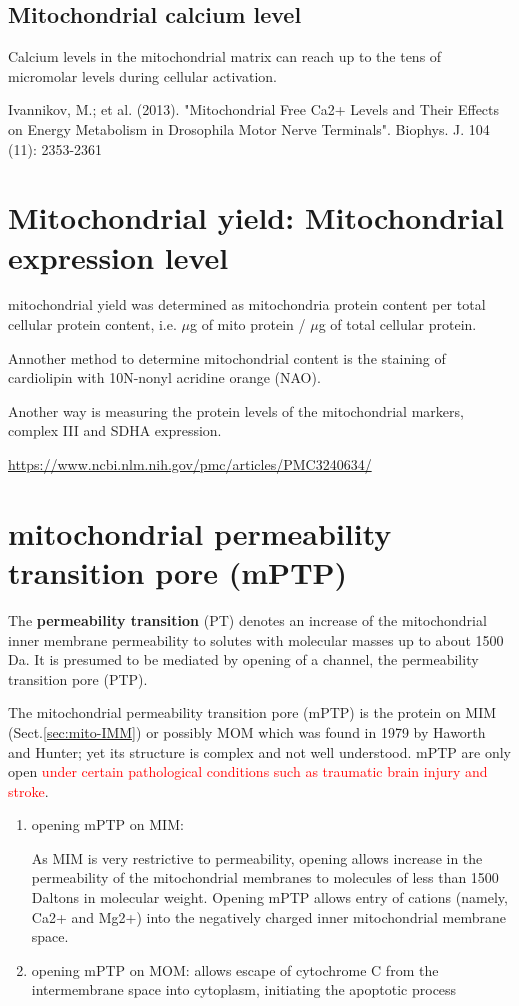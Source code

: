 \subsection{Mitochondrial calcium level}
\label{sec:mitochondria-calcium}

Calcium levels in the mitochondrial matrix can reach up to the tens of
micromolar levels during cellular activation.

Ivannikov, M.; et al. (2013). "Mitochondrial Free Ca2+ Levels and Their Effects
on Energy Metabolism in Drosophila Motor Nerve Terminals". Biophys. J. 104 (11):
2353-2361


\section{Mitochondrial yield: Mitochondrial expression level}
\label{sec:mitochondrial-yield}

mitochondrial yield was determined as mitochondria protein content per total
cellular protein content, i.e. $\mu$g of mito protein / $\mu$g of total
cellular protein.

Annother method to determine mitochondrial content is the staining of
cardiolipin with 10N-nonyl acridine orange (NAO).

Another way is measuring the protein levels of the mitochondrial markers,
complex III and SDHA expression.

\url{https://www.ncbi.nlm.nih.gov/pmc/articles/PMC3240634/}



\section{mitochondrial permeability transition pore (mPTP)}
\label{sec:mPTP}

The {\bf permeability transition} (PT) denotes an increase of the mitochondrial
inner membrane permeability to solutes with molecular masses up to about 1500
Da. It is presumed to be mediated by opening of a channel, the permeability
transition pore (PTP).

The mitochondrial permeability transition pore (mPTP) is the protein on MIM
(Sect.\ref{sec:mito-IMM}) or possibly MOM which was found in 1979 by Haworth and
Hunter; yet its structure is complex and not well understood. mPTP are only open
\textcolor{red}{under certain pathological conditions such as traumatic brain
injury and stroke}.
\begin{enumerate}
  \item opening mPTP on MIM:

As MIM is very restrictive to permeability, opening allows increase in the
permeability of the mitochondrial membranes to molecules of less than 1500
Daltons in molecular weight.
Opening mPTP allows entry of cations (namely, Ca2+ and Mg2+) into the negatively
charged inner mitochondrial membrane space.

  \item opening mPTP on MOM:  allows escape of cytochrome C from the
intermembrane space into cytoplasm, initiating the apoptotic process

\end{enumerate}

